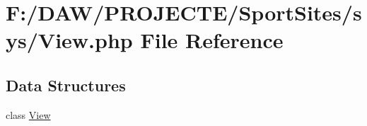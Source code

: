 \hypertarget{_view_8php}{}\section{F\+:/\+D\+A\+W/\+P\+R\+O\+J\+E\+C\+T\+E/\+Sport\+Sites/sys/\+View.php File Reference}
\label{_view_8php}
\subsection*{Data Structures}
\begin{DoxyCompactItemize}
\item 
class \hyperlink{class_view}{View}
\end{DoxyCompactItemize}
